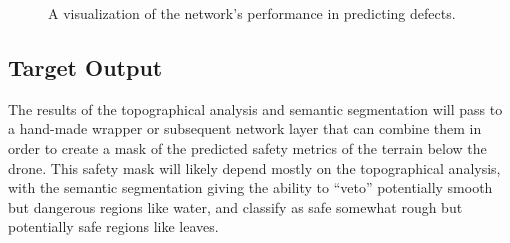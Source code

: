 \begin{figure}
    \caption{A visualization of the network's performance in predicting defects.}
    \label{figure:example_steel_prediction}
\end{figure}

\subsection{Target Output}
\label{section:target_output}

The results of the topographical analysis and semantic segmentation will pass to
a hand-made wrapper
or subsequent network layer
that can combine them in order to create a mask of the predicted safety metrics of the terrain below the drone.
This safety mask will likely depend mostly on the topographical analysis, with the semantic segmentation giving the ability
to ``veto'' potentially smooth but dangerous regions like water, and classify as safe somewhat rough but potentially safe regions like leaves.